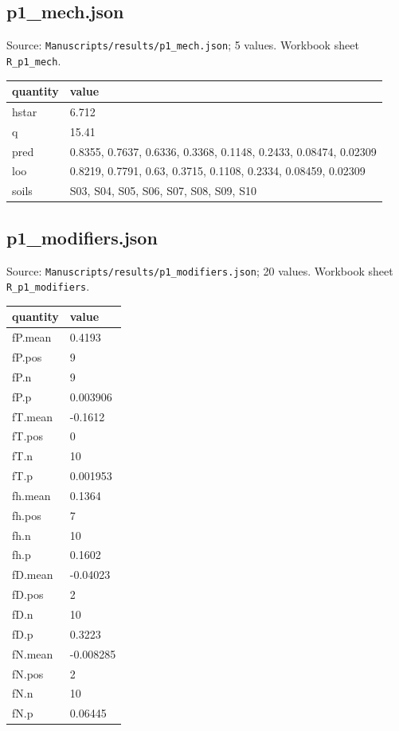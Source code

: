 \subsection*{p1\_mech.json}
\noindent\small Source: \nolinkurl{Manuscripts/results/p1_mech.json}; 5 values. Workbook sheet \texttt{R\_p1\_mech}.\par
{\scriptsize\begin{longtable}{p{}p{}}\toprule\textbf{quantity} & \textbf{value}\\\midrule\endhead
{}hstar & 6.712\\
{}q & 15.41\\
{}pred & 0.8355, 0.7637, 0.6336, 0.3368, 0.1148, 0.2433, 0.08474, 0.02309\\
{}loo & 0.8219, 0.7791, 0.63, 0.3715, 0.1108, 0.2334, 0.08459, 0.02309\\
{}soils & S03, S04, S05, S06, S07, S08, S09, S10\\
\bottomrule\end{longtable}}

\subsection*{p1\_modifiers.json}
\noindent\small Source: \nolinkurl{Manuscripts/results/p1_modifiers.json}; 20 values. Workbook sheet \texttt{R\_p1\_modifiers}.\par
{\scriptsize\begin{longtable}{p{}p{}}\toprule\textbf{quantity} & \textbf{value}\\\midrule\endhead
{}fP.mean & 0.4193\\
{}fP.pos & 9\\
{}fP.n & 9\\
{}fP.p & 0.003906\\
{}fT.mean & -0.1612\\
{}fT.pos & 0\\
{}fT.n & 10\\
{}fT.p & 0.001953\\
{}fh.mean & 0.1364\\
{}fh.pos & 7\\
{}fh.n & 10\\
{}fh.p & 0.1602\\
{}fD.mean & -0.04023\\
{}fD.pos & 2\\
{}fD.n & 10\\
{}fD.p & 0.3223\\
{}fN.mean & -0.008285\\
{}fN.pos & 2\\
{}fN.n & 10\\
{}fN.p & 0.06445\\
\bottomrule\end{longtable}}

